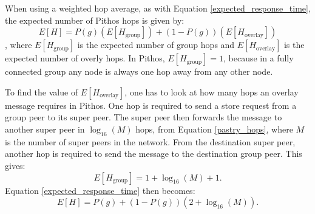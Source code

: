 \documentclass[10pt,a4paper,conference]{IEEEtran}
\begin{document}
When using a weighted hop average, as with Equation \eqref{expected_response_time}, the expected number of Pithos hops is given by:
%
\begin{equation}\label{expected_response_time}
    E[H] = P(g)\left(E\left[H_{\textrm{group}}\right]\right) + \left(1 - P(g)\right)\left(E\left[H_{\textrm{overlay}}\right]\right)
\end{equation}
%
, where $E\left[H_{\textrm{group}}\right]$ is the expected number of group hops and $E\left[H_{\textrm{overlay}}\right]$ is the expected number of
overly hops. In Pithos, $E\left[H_{\textrm{group}}\right] = 1$, because in a fully connected group any node is always one hop away from any other
node.

To find the value of $E\left[H_{\textrm{overlay}}\right]$, one has to look at how many hops an overlay message requires in Pithos. One hop is
required to send a store request from a group peer to its super peer. The super peer then forwards the message to another super peer in
$\log_{16}(M)$ hops, from Equation \eqref{pastry_hops}, where $M$ is the number of super peers in the network. From the destination super peer,
another hop is required to send the message to the destination group peer. This gives:
%
\begin{equation}\label{group_hops}
    E\left[H_{\textrm{group}}\right] = 1 + \log_{16}(M) + 1.
\end{equation}
%
Equation \eqref{expected_response_time} then becomes:
%
\begin{equation}\label{expected_response_time_exp}
    E[H] = P(g) + \left(1 - P(g)\right)\left(2 + \log_{16}\left(M\right)\right).
\end{equation}
\end{document}
